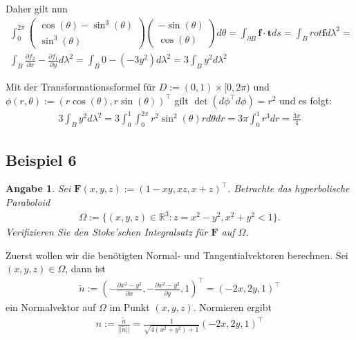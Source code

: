 \documentclass[]{article}
\newtheorem*{angabe*}{Angabe}
\begin{document}
\begin{enumerate}[label*=(\roman*)]
	Daher gilt nun
	\begin{align*}
		\int_{0}^{2\pi} \begin{pmatrix} \cos(\theta)-\sin^3(\theta)\\ \sin^3(\theta) \end{pmatrix} \begin{pmatrix} -\sin(\theta)\\ \cos(\theta) \end{pmatrix} d\theta = \int_{\partial B} \bm{f} \cdot \bm{t} ds = \int_B rot\bm{f} d\lambda^2 = \\
		\int_B \frac{\partial f_2}{\partial x} - \frac{\partial f_1}{\partial y} d\lambda^2 =		\int_B 0 - (-3y^2) d\lambda^2 = 3 \int_B y^2 d\lambda^2
	\end{align*}

	Mit der Transformationssformel für $D:=(0,1)\times[0,2\pi)$ und $\phi(r,\theta):=(r\cos(\theta), r\sin(\theta))^\top$ gilt $\det(d\phi^\top d\phi) = r^2$ und es folgt:
	\begin{align*}
		3 \int_B y^2 d\lambda^2 = 3 \int_{0}^{1} \int_{0}^{2\pi} r^2 \sin^2(\theta) r d\theta dr = 3\pi \int_{0}^{1} r^3 dr = \frac{3\pi}{4}
	\end{align*}
\end{enumerate}
\newpage

\subsection*{Beispiel 6}
\begin{angabe*}
	Sei $\bm{F}(x,y,z):=(1-xy, xz, x+z)^\top$. Betrachte das hyperbolische Paraboloid
	\begin{align*}
		\Omega := \{(x,y,z) \in \mathbb{R}^3: z = x^2-y^2, x^2+y^2 < 1\}.
	\end{align*}
	Verifizieren Sie den Stoke'schen Integralsatz für $\bm{F}$ auf $\Omega$.
\end{angabe*}

Zuerst wollen wir die benötigten Normal- und Tangentialvektoren berechnen.
Sei $(x,y,z) \in \Omega$, dann ist
\begin{align*}
	\tilde{n} := (-\frac{\partial x^2-y^2}{\partial x}, -\frac{\partial x^2-y^2}{\partial y}, 1)^\top = (-2x, 2y, 1)^\top
\end{align*}
ein Normalvektor auf $\Omega$ im Punkt $(x,y,z)$. Normieren ergibt
\begin{align*}
	n:= \frac{\tilde{n}}{||\tilde{n}||} = \frac{1}{\sqrt{4(x^2+y^2)+1}}(-2x, 2y, 1)^\top
\end{align*}
\end{document}
